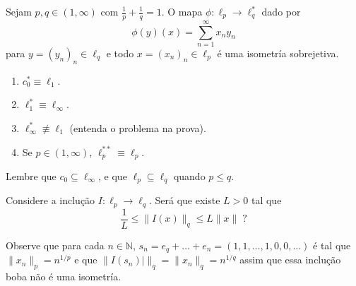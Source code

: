 \documentclass[portuguese]{article}
\theoremstyle{definition}
\newcommand{\N}{\mathbb{N}}
\begin{document}
	\begin{teo}
		Sejam $p,q\in(1,\infty)$ com $\frac{1}{p}+\frac{1}{q}=1$. O mapa $\phi:\ell_p\to\ell_q^*$ dado por
		\[\phi(y)(x)=\sum_{n=1}^\infty x_ny_n\]
		para $y=(y_n)_n\in\ell_q$ e todo $x=(x_n)_n\in\ell_p$ é uma isometría sobrejetiva.
	\end{teo}
	
	\begin{exemplos}\leavevmode
		\begin{enumerate}
			\item $c^*_0\equiv\ell_1$.
			\item $\ell_1^*\equiv\ell_\infty$.
			\item $\ell_\infty^*\not\equiv\ell_1$ {\color{orange}(entenda o problema na prova)}.
			\item Se $p\in(1,\infty)$, $\ell^{**}_p\equiv\ell_p$.
		\end{enumerate}
	\end{exemplos}
	
	Lembre que $c_0\subseteq\ell_\infty$, e que $\ell_p\subseteq\ell_q$ quando $p\leq q$.
	
	\begin{pregunta}
		Considere a inclução $I:\ell_p\to\ell_q$. Será que existe $L>0$ tal que
		\[\frac{1}{L}\leq\| I(x)\|_q\leq L\| x\|\;?\]
	\end{pregunta}
	Observe que para cada $n\in\N$, $s_n=e_q+\ldots+e_n=(1,1,\ldots,1,0,0,\ldots)$ é tal que
	$\| x_n\|_p=n^{1/p}$ e que $\| I(s_n)|\|_q=\| x_n\|_q=n^{1/q}$ assim que essa inclução boba não é uma isometría.
	
\end{document}
